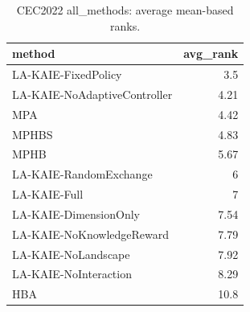 \begin{table}[t]
\centering
\scriptsize
\caption{CEC2022 all_methods: average mean-based ranks.}
\label{tab:cec2022_all_methods_ranks}
\begin{tabular}{lr}
\toprule
method & avg\_rank \\
\midrule
LA-KAIE-FixedPolicy & 3.5 \\
LA-KAIE-NoAdaptiveController & 4.21 \\
MPA & 4.42 \\
MPHBS & 4.83 \\
MPHB & 5.67 \\
LA-KAIE-RandomExchange & 6 \\
LA-KAIE-Full & 7 \\
LA-KAIE-DimensionOnly & 7.54 \\
LA-KAIE-NoKnowledgeReward & 7.79 \\
LA-KAIE-NoLandscape & 7.92 \\
LA-KAIE-NoInteraction & 8.29 \\
HBA & 10.8 \\
\bottomrule
\end{tabular}
\end{table}
